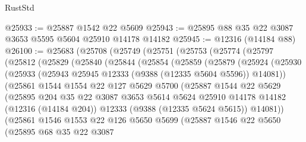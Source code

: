 \begin{lexlean}{RustStd}
\begin{coremodule}
@25933 := @25887 @1542 @22 @5609
@25943 := @25895 @88 @35 @22 @3087 @3653 @5595 @5604 @25910 @14178 @14182
@25945 := @12316 (@14184 @88)
@26100 := @25683
    (@25708
      (@25749
        (@25751
          (@25753
            (@25774
              (@25797
                (@25812
                  (@25829
                    (@25840
                      (@25844
                        (@25854
                          (@25859
                            (@25879
                              (@25924
                                (@25930
                                  (@25933
                                    (@25943 @25945 @12333 (@9388 (@12335 @5604 @5596)) @14081))
                                  (@25861
                                    @1544
                                    @1554
                                    @22
                                    @127
                                    @5629
                                    @5700
                                    (@25887
                                      @1544
                                      @22
                                      @5629
                                      (@25895
                                        @204
                                        @35
                                        @22
                                        @3087
                                        @3653
                                        @5614
                                        @5624
                                        @25910
                                        @14178
                                        @14182
                                        (@12316 (@14184 @204))
                                        @12333
                                        (@9388 (@12335 @5624 @5615))
                                        @14081))
                                    (@25861
                                      @1546
                                      @1553
                                      @22
                                      @126
                                      @5650
                                      @5699
                                      (@25887
                                        @1546
                                        @22
                                        @5650
                                        (@25895
                                          @68
                                          @35
                                          @22
                                          @3087

\end{coremodule}
\end{lexlean}
